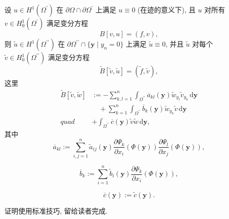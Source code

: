 \begin{Lemma}
\label{lem:boundary-coordinate-variational-transformation}
设 $u\in H^1(\Omega^{\prime})$ 在 $\partial\Omega\cap\partial\Omega^{\prime}$ 上满足 $u\equiv0$ (在迹的意义下), 且 $u$ 对所有 $v\in H_0^1(\Omega^{\prime})$ 满足变分方程
\begin{equation}\label{eq:boundary-coordinate-original-variational-equation}
B[v,u]=(f,v),
\end{equation}
则 $\widetilde u\in H^1(\Omega^{\prime\prime})$ 在 $\partial\Omega^{\prime\prime}\cap\{\bm{y}\mid y_n=0\}$ 上满足 $\widetilde u\equiv0$, 并且 $\widetilde u$ 对每个 $\widetilde v\in H_0^1(\Omega^{\prime\prime})$ 满足变分方程
\begin{equation}\label{eq:boundary-coordinate-transformed-variational-equation}
\widetilde B[\widetilde v,\widetilde u]=(\widetilde f,\widetilde v),
\end{equation}
这里
\begin{equation}\label{eq:boundary-coordinate-transformed-bilinear-form}
\begin{aligned}
\widetilde B[\widetilde v,\widetilde w]&:=-\sum_{k,l=1}^n\int_{\Omega^{\prime\prime}}\overline a_{kl}(\bm{y})\widetilde w_{y_l}\widetilde v_{y_k}\,\mathrm{d}\bm{y}\\
&\quad+\sum_{k=1}^n\int_{\Omega^{\prime\prime}}\overline b_k(\bm{y})\widetilde w_{y_k}\widetilde v\,\mathrm{d}\bm{y}\\
\mathit{quad}&+\int_{\Omega^{\prime\prime}}\overline c(\bm{y})\widetilde v\widetilde w\,\mathrm{d}\bm{y},
\end{aligned}
\end{equation}
其中
\begin{equation}\label{eq:boundary-coordinate-transformed-principal-coefficients}
\overline a_{kl}:=\sum_{i,j=1}^n\widetilde a_{ij}(\bm{y})\frac{\partial\Psi_k}{\partial x_i}(\Phi(\bm{y}))\frac{\partial\Psi_l}{\partial x_j}(\Phi(\bm{y})), 
\end{equation}

\begin{equation}\label{eq:boundary-coordinate-transformed-first-order-coefficients}
\overline b_k:=\sum_{i=1}^n\widetilde b_i(\bm{y})\frac{\partial\Psi_k}{\partial x_i}(\Phi(\bm{y})), 
\end{equation}

\begin{equation}\label{eq:boundary-coordinate-transformed-zero-order-coefficient}
\overline c(\bm{y}):=\widetilde c(\bm{y}).
\end{equation}

\end{Lemma}

证明使用标准技巧, 留给读者完成.
